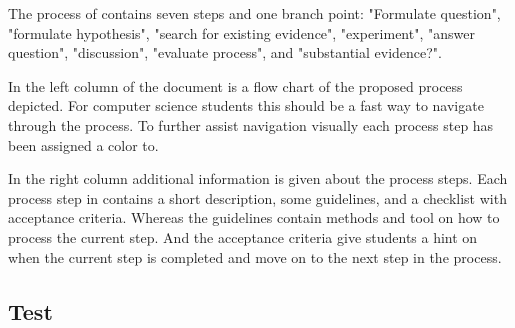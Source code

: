 \begin{minipage}{\linewidth}
The process of \checklist {} contains seven steps and one branch point: "Formulate question", "formulate hypothesis", "search for existing evidence", "experiment", "answer question", "discussion", "evaluate process", and "substantial evidence?".

In the left column of the document is a flow chart of the proposed process depicted. For computer science students this should be a fast way to navigate through the process. To further assist navigation visually each process step has been assigned a color to.

In the right column additional information is given about the process steps. Each process step in \checklist contains a short description, some guidelines, and a checklist with acceptance criteria. Whereas the guidelines contain methods and tool on how to process the current step. And the acceptance criteria give students a hint on when the current step is completed and move on to the next step in the process.

\subsection{Test}
\lipsum[1]

\end{minipage}

